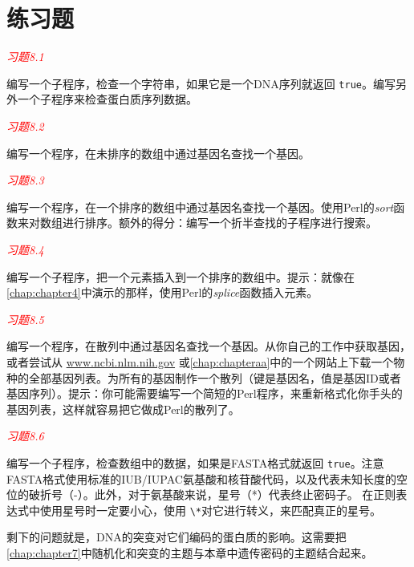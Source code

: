 \section{练习题}
\textcolor{red}{\textit{习题8.1}}
\begin{adjustwidth}{1cm}{}
编写一个子程序，检查一个字符串，如果它是一个DNA序列就返回 \verb|true|。编写另外一个子程序来检查蛋白质序列数据。
\end{adjustwidth}

\textcolor{red}{\textit{习题8.2}}
\begin{adjustwidth}{4em}{}
编写一个程序，在未排序的数组中通过基因名查找一个基因。
\end{adjustwidth}

\textcolor{red}{\textit{习题8.3}}
\begin{adjustwidth}{4em}{}
编写一个程序，在一个排序的数组中通过基因名查找一个基因。使用Perl的\textit{sort}函数来对数组进行排序。额外的得分：编写一个折半查找的子程序进行搜索。
\end{adjustwidth}

\textcolor{red}{\textit{习题8.4}}
\begin{adjustwidth}{4em}{}
编写一个子程序，把一个元素插入到一个排序的数组中。提示：就像在\autoref{chap:chapter4}中演示的那样，使用Perl的\textit{splice}函数插入元素。
\end{adjustwidth}

\textcolor{red}{\textit{习题8.5}}
\begin{adjustwidth}{4em}{}
编写一个程序，在散列中通过基因名查找一个基因。从你自己的工作中获取基因，或者尝试从 \href{www.ncbi.nlm.nih.gov}{www.ncbi.nlm.nih.gov} 或\autoref{chap:chapteraa}中的一个网站上下载一个物种的全部基因列表。为所有的基因制作一个散列（键是基因名，值是基因ID或者基因序列）。提示：你可能需要编写一个简短的Perl程序，来重新格式化你手头的基因列表，这样就容易把它做成Perl的散列了。
\end{adjustwidth}

\textcolor{red}{\textit{习题8.6}}
\begin{adjustwidth}{4em}{}
编写一个子程序，检查数组中的数据，如果是FASTA格式就返回 \verb|true|。注意FASTA格式使用标准的IUB/IUPAC氨基酸和核苷酸代码，以及代表未知长度的空位的破折号（-）。此外，对于氨基酸来说，星号（*）代表终止密码子。 在正则表达式中使用星号时一定要小心，使用 \verb|\*|对它进行转义，来匹配真正的星号。
\end{adjustwidth}

剩下的问题就是，DNA的突变对它们编码的蛋白质的影响。这需要把\autoref{chap:chapter7}中随机化和突变的主题与本章中遗传密码的主题结合起来。

